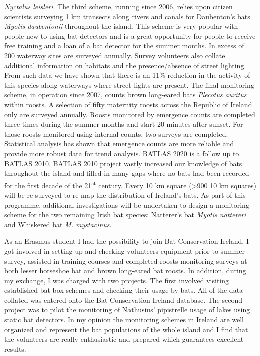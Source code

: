 {\emph{Nyctalus leisleri}. The third scheme, running since 2006, relies upon citizen scientists surveying 1 km transects along rivers and canals for Daubenton’s bats \emph{Myotis daubentonii} throughout the island. This scheme is very popular with people new to using bat detectors and is a great opportunity for people to receive free training and a loan of a bat detector for the summer months. In excess of 200 waterway sites are surveyed annually. Survey volunteers also collate additional information on habitats and the presence/absence of street lighting. From such data we have shown that there is an 11\% reduction in the activity of this species along waterways where street lights are present. The final monitoring scheme, in operation since 2007, counts brown long-eared bats \emph{Plecotus auritus} within roosts. A selection of fifty maternity roosts across the Republic of Ireland only are surveyed annually. Roosts monitored by emergence counts are completed three times during the summer months and start 20 minutes after sunset. For those roosts monitored using internal counts, two surveys are completed. Statistical analysis has shown that emergence counts are more reliable and provide more robust data for trend analysis. BATLAS 2020 is a follow up to BATLAS 2010. BATLAS 2010 project vastly increased our knowledge of bats throughout the island and filled in many gaps where no bats had been recorded for the first decade of the 21\textsuperscript{st} century. Every 10 km square (>900 10 km squares) will be re-surveyed to re-map the distribution of Ireland’s bats. As part of this programme, additional investigations will be undertaken to design a monitoring scheme for the two remaining Irish bat species: Natterer’s bat \emph{Myotis nattereri} and Whiskered bat \emph{M. mystacinus}.

As an Erasmus student I had the possibility to join Bat Conservation Ireland. I got involved in setting up and checking volunteers equipment prior to summer survey, assisted in training courses and completed roosts monitoring surveys at both lesser horseshoe bat and brown long-eared bat roosts. In addition, during my exchange, I was charged with two projects. The first involved visiting established bat box schemes and checking their usage by bats. All of the data collated was entered onto the Bat Conservation Ireland database. The second project was to pilot the monitoring of Nathusius’ pipistrelle usage of lakes using static bat detectors. In my opinion the monitoring schemes in Ireland are well organized  and represent the bat populations of the whole island and  I find that the volunteers are really enthusiastic and prepared which guarantees excellent results.
} %